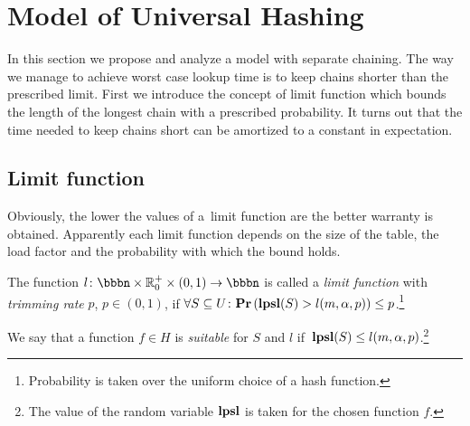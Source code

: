 \section{Model of Universal Hashing}
\label{section-model}
In this section we propose and analyze a model with separate chaining. 
The way we manage to achieve worst case lookup time is to keep chains shorter than the prescribed limit. 
First we introduce the concept of limit function which bounds the length of the longest chain with a prescribed probability. 
It turns out that the time needed to keep chains short can be amortized to a constant in expectation.

\subsection{Limit function}
Obviously, the lower the values of a~limit function are the better warranty is obtained. 
Apparently each limit function depends on the size of the table, the load factor and the probability with which the bound holds.

\begin{definition}
\label{definition-limit-function}
The function $l\colon \bbbn \times \mathbb{R}_0^+ \times (0, 1) \rightarrow \bbbn$ is called a \emph{limit function} with \emph{trimming rate} $p$, $p \in (0, 1)$, if $\forall S \subseteq U\colon \mathbf{Pr}\left(\mathbf{lpsl}(S) > l(m, \alpha, p)\right) \leq p$.\footnote{Probability is taken over the uniform choice of a hash function.}

We say that a function $f \in H$ is \emph{suitable} for $S$ and $l$ if $\,\mathbf{lpsl}(S) \le l(m, \alpha, p)$.\footnote{The value of the random variable $\mathbf{lpsl}$ is taken for the chosen function $f$.}
\end{definition}

